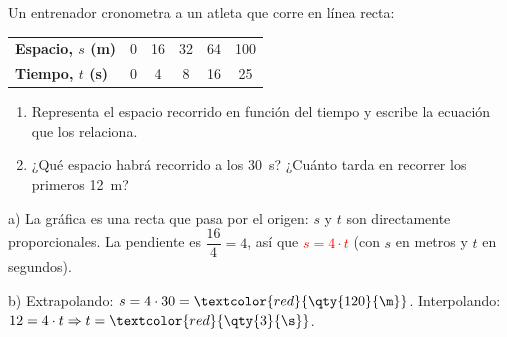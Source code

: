 \begin{example}
    Un entrenador cronometra a un atleta que corre en línea recta:
    \begin{center}
        \begin{tabular}{@{}lccccc@{}}
            \toprule
            \textbf{Espacio, \(s\) (m)} & 0 & 16 & 32 & 64 & 100 \\[3pt]
            \textbf{Tiempo, \(t\) (s)} & 0 & 4 & 8 & 16 & 25 \\
            \bottomrule
        \end{tabular}
    \end{center}
    \begin{enumerate}[label=\alph*)]
        \item Representa el espacio recorrido en función del tiempo y escribe la ecuación que los relaciona.
        \item ¿Qué espacio habrá recorrido a los \qty{30}{\s}? ¿Cuánto tarda en recorrer los primeros \qty{12}{\m}?
    \end{enumerate}

    \begin{center}
    \end{center}

    a) La gráfica es una recta que pasa por el origen: \(s\) y \(t\) son directamente proporcionales. La pendiente es \(\dfrac{16}{4} = 4\), así que \textcolor{red}{\(s = 4 \cdot t\)} (con \(s\) en metros y \(t\) en segundos).

    b) Extrapolando: \(s = 4 \cdot 30 = \textcolor{red}{\qty{120}{\m}}\). Interpolando: \(12 = 4 \cdot t \Rightarrow t = \textcolor{red}{\qty{3}{\s}}\).
\end{example}

